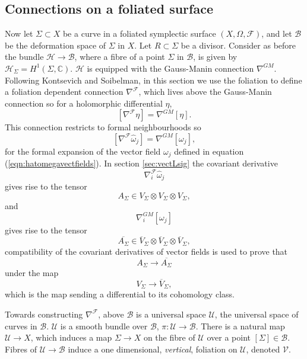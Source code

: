     \subsection{Connections on a foliated surface}
    \label{sec:connonfoliated}
    Now let \( \Sigma \subset X\) be a curve in a foliated symplectic surface \( (X, \Omega, \mathcal{F} )\), and let \( \mathcal{B}\) be the deformation space of \( \Sigma \) in \(X\). Let \(R \subset \Sigma \) be a divisor. Consider as before the bundle \( \mathcal{H} \rightarrow \mathcal{B}\), where a fibre of a point \( \Sigma\) in \( \mathcal{B}\), is given by \( \mathcal{H}_{\Sigma} = H^1(\Sigma, \mathbb{C})\). \( \mathcal{H}\) is equipped with the Gauss-Manin connection \( \nabla^{GM}\). Following Kontsevich and Soibelman, in this section we use the foliation to define a foliation dependent connection \( \nabla^{\mathcal{F}}\), which lives above the Gauss-Manin connection so for a holomorphic differential \( \eta\),
    \[ [ \nabla^{\mathcal{F}} \eta ] = \nabla^{GM} [\eta].\]
    This connection restricts to formal neighbourhoods so 
    \[ [ \nabla^{\mathcal{F}} \widehat{\omega}_j ] = \nabla^{GM}[\omega_j],\]
    for the formal expansion of the vector field \( \omega_j\) defined in equation (\ref{eqn:hatomegavectfields}). In section \ref{sec:vectLsig} the covariant derivative \[\nabla_i^{\mathcal{F}} \widehat{\omega}_j\] 
    gives rise to the tensor 
    \[ A_\Sigma\in V_\Sigma\otimes V_\Sigma\otimes V_\Sigma,\] 
    and 
    \[ \nabla_i^{GM}\left[\omega_j\right]\] 
    gives rise to the tensor 
    \[ \overline{A_\Sigma} \in\overline{V}_\Sigma\otimes \overline{V}_\Sigma\otimes \overline{V}_\Sigma, \] 
    compatibility of the covariant derivatives of vector fields is used to prove that 
    \[ A_\Sigma \rightarrow \overline{A_\Sigma} \] under the map \[ V_\Sigma \to\overline{V}_\Sigma, \] which is the map sending a differential to its cohomology class.
    
    Towards constructing \( \nabla^{\mathcal{F}}\), above \( \mathcal{B}\) is a universal space \( \mathcal{U}\), the universal space of curves in \( \mathcal{B}\). \( \mathcal{U}\) is a smooth bundle over \( \mathcal{B}\), \( \pi  : \mathcal{U} \rightarrow \mathcal{B}\). There is a natural map \( \mathcal{U} \rightarrow X \), which induces a map \( \Sigma \rightarrow X\) on the fibre of \( \mathcal{U} \) over a point \( [\Sigma] \in \mathcal{B}\). Fibres of \( \mathcal{U} \rightarrow \mathcal{B}\) induce a one dimensional, \emph{vertical}, foliation on \(\mathcal{U}\), denoted \(\mathcal{V}\).
    
